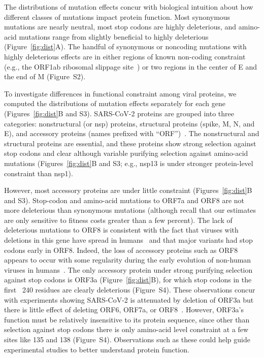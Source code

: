 \documentclass[9pt,twocolumn,twoside]{gsajnl_modified}
\begin{document}
The distributions of mutation effects concur with biological intuition about how different classes of mutations impact protein function.
Most synonymous mutations are nearly neutral, most stop codons are highly deleterious, and amino-acid mutations range from slightly beneficial to highly deleterious (Figure~\ref{fig:dist}A).
The handful of synonymous or noncoding mutations with highly deleterious effects are in either regions of known non-coding constraint (e.g., the ORF1ab ribosomal slippage site~\cite{bhatt2021structural}) or two regions in the center of E and the end of M (Figure~S2).

To investigate differences in functional constraint among viral proteins, we computed the distributions of mutation effects separately for each gene (Figures~\ref{fig:dist}B and S3).
SARS-CoV-2 proteins are grouped into three categories: nonstructural (or nsp) proteins, structural proteins (spike, M, N, and E), and accessory proteins (names prefixed with ``ORF'')~\citep{v2021coronavirus}.
The nonstructural and structural proteins are essential, and these proteins show strong selection against stop codons and clear although variable purifying selection against amino-acid mutations (Figures~\ref{fig:dist}B and S3; e.g., nsp13 is under stronger protein-level constraint than nsp1).

However, most accessory proteins are under little constraint (Figures~\ref{fig:dist}B and S3).
Stop-codon and amino-acid mutations to ORF7a and ORF8 are not more deleterious than synonymous mutations (although recall that our estimates are only sensitive to fitness costs greater than a few percent).
The lack of deleterious mutations to ORF8 is consistent with the fact that viruses with deletions in this gene have spread in humans~\citep{su2020discovery} and that major variants had stop codons early in ORF8.
Indeed, the loss of accessory proteins such as ORF8 appears to occur with some regularity during the early evolution of non-human viruses in humans~\citep{rochman2022molecular}.
The only accessory protein under strong purifying selection against stop codons is ORF3a (Figure~\ref{fig:dist}B), for which stop codons in the first ~240 residues are clearly deleterious (Figure~S4).
These observations concur with experiments showing SARS-CoV-2 is attenuated by deletion of ORF3a but there is little effect of deleting ORF6, ORF7a, or ORF8~\citep{mcgrath2022sars,silvas2021contribution,liu2022live}.
However, ORF3a's function must be relatively insensitive to its protein sequence, since other than selection against stop codons there is only amino-acid level constraint at a few sites like 135 and 138 (Figure~S4).
Observations such as these could help guide experimental studies to better understand protein function.
\end{document}
